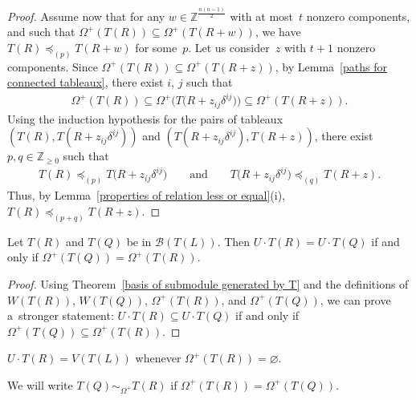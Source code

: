 \begin{proof}
Assume now that for any $w\in\mathbb{Z}^{\frac{n(n-1)}{2}}$ with at most~$t$ nonzero components, and such that
$\Omega^{+}(T(R))\subseteq\Omega^{+}(T(R+w))$, we have $T(R)\preceq_{(p)} T(R+w)$ for some~$p$.
Let us consider~$z$ with $t+1$ nonzero components.
Since $\Omega^{+}(T(R))\subseteq \Omega^{+}(T(R+z))$, by Lemma~\ref{paths for connected tableaux}, there exist $i$, $j$
such that
\begin{gather*}
\Omega^{+}(T(R))\subseteq\Omega^{+}\big(T\big(R+z_{ij}\delta^{ij}\big)\big)\subseteq \Omega^{+}(T(R+z)).
\end{gather*}
Using the induction hypothesis for the pairs of tableaux $(T(R), T(R+z_{ij}\delta^{ij}))$ and
$(T(R+z_{ij}\delta^{ij}),T(R+z))$, there exist $p,q\in\mathbb{Z}_{\geq 0}$ such that
\begin{gather*}
T(R)\preceq_{(p)} T\big(R+z_{ij}\delta^{ij}\big)\qquad \text{and} \qquad T\big(R+z_{ij}\delta^{ij}\big)\preceq_{(q)} T(R+z).
\end{gather*}
Thus, by Lemma~\ref{properties of relation less or equal}(i), $T(R)\preceq_{(p+q)}T(R+z)$.
\end{proof}

\begin{Proposition}
\label{when two tableaux generate the same submodule}
Let $T(R)$ and $T(Q)$ be in $\mathcal{B}(T(L))$.
Then $U\cdot T(R)= U\cdot T(Q)$ if and only if $\Omega^{+}(T(Q))=\Omega^{+}(T(R))$.
\end{Proposition}
\begin{proof}\sloppy
Using Theorem~\ref{basis of submodule generated by T} and the def\/initions of $ W(T(R))$, $W(T(Q))$, $\Omega^{+}(T(R))$,
and $\Omega^{+}(T(Q))$, we can prove a~stronger statement: $U\cdot T(R) \subseteq U\cdot T(Q)$ if and only if
$\Omega^{+}(T(Q))\subseteq\Omega^{+}(T(R))$.
\end{proof}

\begin{Corollary}
$U \cdot T(R)=V(T(L))$ whenever $\Omega^{+}(T(R))=\varnothing$.
\end{Corollary}

\begin{Definition}
We will write $T(Q)\sim_{\Omega^+}T(R)$ if $\Omega^{+}(T(R)) = \Omega^{+}(T(Q))$.
\end{Definition}


